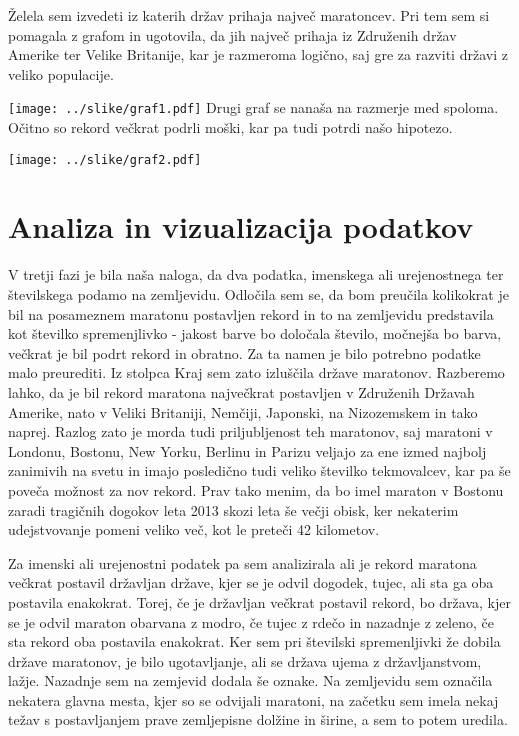 \documentclass[11pt,a4paper]{article}
\begin{document}
Želela sem izvedeti iz katerih držav prihaja največ maratoncev. Pri tem sem si pomagala z grafom in ugotovila, da jih največ prihaja iz Združenih držav Amerike ter Velike Britanije, kar je razmeroma logično, saj gre za razviti državi z veliko populacije. 

\texttt{[image: ../slike/graf1.pdf]}
Drugi graf se nanaša na razmerje med spoloma. Očitno so rekord večkrat podrli moški, kar pa tudi potrdi našo hipotezo. 

\texttt{[image: ../slike/graf2.pdf]}

\section{Analiza in vizualizacija podatkov}

V tretji fazi je bila naša naloga, da dva podatka, imenskega ali urejenostnega ter številskega podamo na zemljevidu. 
Odločila sem se, da bom preučila kolikokrat je bil na posameznem maratonu postavljen rekord in to na zemljevidu predstavila kot številko spremenjlivko - jakost barve bo določala število, močnejša bo barva, večkrat je bil podrt rekord in obratno. Za ta namen je bilo potrebno podatke malo preurediti. Iz stolpca Kraj sem zato izluščila države maratonov. 
Razberemo lahko, da je bil rekord maratona največkrat postavljen v Združenih Državah Amerike, nato v Veliki Britaniji, Nemčiji, Japonski, na Nizozemskem in tako naprej. Razlog zato je morda tudi priljubljenost teh maratonov, saj maratoni v Londonu, Bostonu, New Yorku, Berlinu in Parizu veljajo za ene izmed najbolj zanimivih na svetu in imajo posledično tudi veliko številko tekmovalcev, kar pa še poveča možnost za nov rekord. Prav tako menim, da bo imel maraton v Bostonu zaradi tragičnih dogokov leta 2013 skozi leta še večji obisk, ker nekaterim udejstvovanje pomeni veliko več, kot le preteči 42 kilometov.



Za imenski ali urejenostni podatek pa sem analizirala ali je rekord maratona večkrat postavil državljan države, kjer se je odvil dogodek, tujec, ali sta ga oba postavila enakokrat. Torej, če je državljan večkrat postavil rekord, bo država, kjer se je odvil maraton obarvana z modro, če tujec z rdečo in nazadnje z zeleno, če sta rekord oba postavila enakokrat.
Ker sem pri številski spremenljivki že dobila države maratonov, je bilo ugotavljanje, ali se država ujema z državljanstvom, lažje.
Nazadnje sem na zemjevid dodala še oznake. Na zemljevidu sem označila nekatera glavna mesta, kjer so se odvijali maratoni, na začetku sem imela nekaj težav s postavljanjem prave zemljepisne dolžine in širine, a sem to potem uredila.
\end{document}

